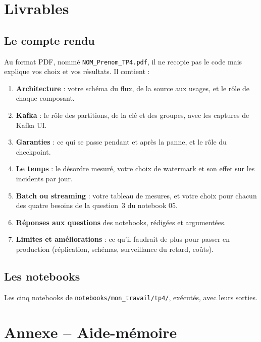 \documentclass[11pt,a4paper]{article}
\newcommand{\cmd}[1]{\texttt{#1}}
\begin{document}
\section{Livrables}\label{sec:livrables}

\subsection*{Le compte rendu}

Au format PDF, nommé \cmd{NOM\_Prenom\_TP4.pdf}, il ne recopie pas le code mais explique vos choix
et vos résultats. Il contient :
\begin{enumerate}[leftmargin=*,itemsep=2pt]
  \item \textbf{Architecture} : votre schéma du flux, de la source aux usages, et le rôle de chaque composant.
  \item \textbf{Kafka} : le rôle des partitions, de la clé et des groupes, avec les captures de Kafka UI.
  \item \textbf{Garanties} : ce qui se passe pendant et après la panne, et le rôle du checkpoint.
  \item \textbf{Le temps} : le désordre mesuré, votre choix de watermark et son effet sur les
        incidents par jour.
  \item \textbf{Batch ou streaming} : votre tableau de mesures, et votre choix pour chacun des quatre
        besoins de la question~3 du notebook 05.
  \item \textbf{Réponses aux questions} des notebooks, rédigées et argumentées.
  \item \textbf{Limites et améliorations} : ce qu'il faudrait de plus pour passer en production
        (réplication, schémas, surveillance du retard, coûts).
\end{enumerate}

\subsection*{Les notebooks}

Les cinq notebooks de \cmd{notebooks/mon\_travail/tp4/}, exécutés, avec leurs sorties.

\clearpage
\section*{Annexe -- Aide-mémoire}\label{sec:aidememoire}
\end{document}
